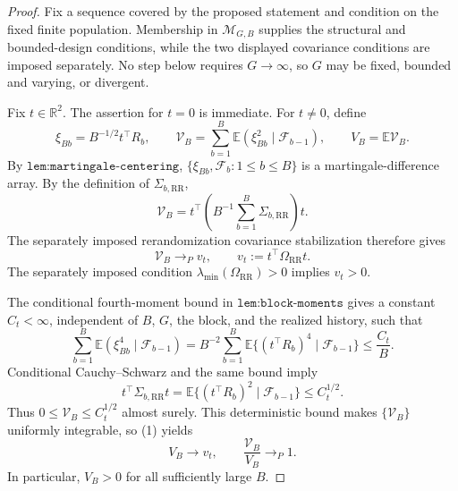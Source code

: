 \documentclass{article}
\begin{document}
\begin{proof}
Fix a sequence covered by the proposed statement and condition on the fixed finite population.  Membership in \(\mathcal M_{G,B}\) supplies the structural and bounded-design conditions, while the two displayed covariance conditions are imposed separately.  No step below requires \(G\to\infty\), so \(G\) may be fixed, bounded and varying, or divergent.

Fix \(t\in\mathbb R^2\).  The assertion for \(t=0\) is immediate.  For \(t\ne0\), define
\[
 \xi_{Bb}=B^{-1/2}t^\top R_b,
 \qquad
 \mathcal V_B=\sum_{b=1}^B
   \mathbb E(\xi_{Bb}^2\mid\mathcal F_{b-1}),
 \qquad
 V_B=\mathbb E\mathcal V_B.
\]
By \(\texttt{lem:martingale-centering}\), \(\{\xi_{Bb},\mathcal F_b:1\leq b\leq B\}\) is a martingale-difference array.  By the definition of \(\Sigma_{b,\mathrm{RR}}\),
\[
 \mathcal V_B
 =t^\top\left(B^{-1}\sum_{b=1}^B\Sigma_{b,\mathrm{RR}}\right)t.
\]
The separately imposed rerandomization covariance stabilization therefore gives
\[
 \mathcal V_B\longrightarrow_P v_t,
 \qquad
 v_t:=t^\top\Omega_{\mathrm{RR}}t.                         \tag{1}
\]
The separately imposed condition \(\lambda_{\min}(\Omega_{\mathrm{RR}})>0\) implies \(v_t>0\).

The conditional fourth-moment bound in \(\texttt{lem:block-moments}\) gives a constant \(C_t<\infty\), independent of \(B\), \(G\), the block, and the realized history, such that
\[
 \sum_{b=1}^B\mathbb E(\xi_{Bb}^4\mid\mathcal F_{b-1})
 =B^{-2}\sum_{b=1}^B
   \mathbb E\{(t^\top R_b)^4\mid\mathcal F_{b-1}\}
 \leq \frac{C_t}{B}.                                      \tag{2}
\]
Conditional Cauchy--Schwarz and the same bound imply
\[
 t^\top\Sigma_{b,\mathrm{RR}}t
 =\mathbb E\{(t^\top R_b)^2\mid\mathcal F_{b-1}\}
 \leq C_t^{1/2}.                                           \tag{3}
\]
Thus \(0\leq\mathcal V_B\leq C_t^{1/2}\) almost surely.  This deterministic bound makes \(\{\mathcal V_B\}\) uniformly integrable, so (1) yields
\[
 V_B\longrightarrow v_t,
 \qquad
 \frac{\mathcal V_B}{V_B}\longrightarrow_P1.             \tag{4}
\]
In particular, \(V_B>0\) for all sufficiently large \(B\).


\end{proof}
\end{document}
